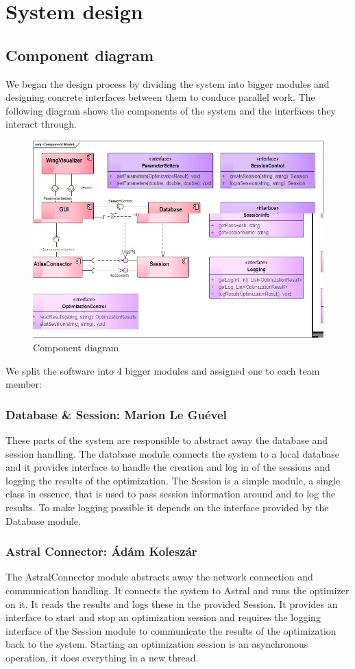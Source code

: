 \documentclass[10pt,a4paper]{report}
\begin{document}
\chapter{System design}
\label{ch:design}
\section{Component diagram}
We began the design process by dividing the system into bigger modules and designing concrete interfaces between them to conduce parallel work. The following diagram shows the components of the system and the interfaces they interact through.

\begin{figure}[h!]
\includegraphics[width=\textwidth]{CompModel.jpg}
\caption{Component diagram}
\end{figure}

We split the software into 4 bigger modules and assigned one to each team member:
 
\subsection{Database \& Session: Marion Le Guével}
These parts of the system are responsible to abstract away the database and session handling. The database module connects the system to a local database and it provides interface to handle the creation and log in of the sessions and logging the results of the optimization. The Session is a simple module, a single class in essence, that is used to pass session information around and to log the results. To make logging possible it depends on the interface provided by the Database module.
\subsection{Astral Connector: Ádám Koleszár}
The AstralConnector module abstracts away the network connection and communication handling. It connects the system to Astral and runs the optimizer on it. It reads the results and logs these in the provided Session. It provides an interface to start and stop an optimization session and requires the logging interface of the Session module to communicate the results of the optimization back to the system. Starting an optimization session is an asynchronous operation, it does everything in a new thread. 
\end{document}
